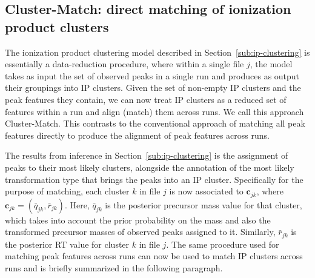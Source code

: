 \subsection{Cluster-Match: direct matching of ionization product clusters\label{sub:cluster-match}}

The ionization product clustering model described in Section~\ref{sub:ip-clustering} is essentially a data-reduction procedure, where within a single file $j$, the model takes as input the set of observed peaks in a single run and produces as output their groupings into IP clusters. Given the set of non-empty IP clusters and the peak features they contain, we can now treat IP clusters as a reduced set of features within a run and align (match) them across runs. We call this approach Cluster-Match. This contrasts to the conventional approach of matching all peak features directly to produce the alignment of peak features across runs. 

The results from inference in Section~\ref{sub:ip-clustering} is the assignment of peaks to their most likely clusters, alongside the annotation of the most likely transformation type that brings the peaks into an IP cluster. Specifically for the purpose of matching, each cluster $k$ in file $j$ is now associated to $\boldsymbol{c}_{jk}$, where $\boldsymbol{c}_{jk}=({\bar{q}}_{jk}, {\bar{r}}_{jk})$. Here, ${\bar{q}}_{jk}$ is the posterior precursor mass value for that cluster, which takes into account the prior probability on the mass and also the transformed precursor masses of observed peaks assigned to it. Similarly, ${\bar{r}}_{jk}$ is the posterior RT value for cluster $k$ in file $j$. The same procedure used for matching peak features across runs can now be used to match IP clusters across runs and is briefly summarized in the following paragraph.

